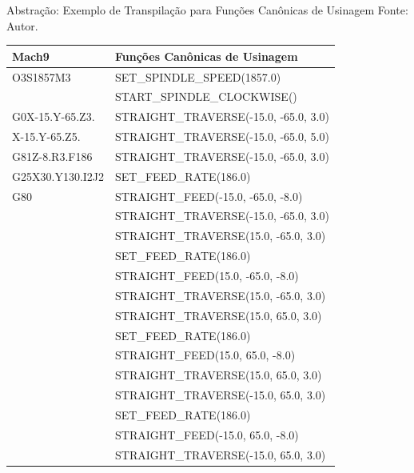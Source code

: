 \documentclass[aspectratio=169]{beamer}
\begin{document}
{\begin{frame}{Abstração: Exemplo de Transpilação para Funções Canônicas de Usinagem}
  \scriptsize{Fonte: Autor.}
  \begin{table}[H]
    \centering
    \begin{tabular}{ |l|l| } 
      \hline
      \tiny{\bfseries{Mach9}} & \tiny{\bfseries{Funções Canônicas de Usinagem}} \\
      \hline
      \tiny{O3S1857M3} & \tiny{SET\_SPINDLE\_SPEED(1857.0)} \\
      & \tiny{START\_SPINDLE\_CLOCKWISE()} \\
      \hline
      \tiny{G0X-15.Y-65.Z3.} & \tiny{STRAIGHT\_TRAVERSE(-15.0, -65.0, 3.0)} \\
      \hline
      \tiny{X-15.Y-65.Z5.} & \tiny{STRAIGHT\_TRAVERSE(-15.0, -65.0, 5.0)} \\
      \hline
      \tiny{G81Z-8.R3.F186} & \tiny{STRAIGHT\_TRAVERSE(-15.0, -65.0, 3.0)} \\
      \tiny{G25X30.Y130.I2J2} & \tiny{SET\_FEED\_RATE(186.0)} \\
      \tiny{G80} & \tiny{STRAIGHT\_FEED(-15.0, -65.0, -8.0)} \\
      & \tiny{STRAIGHT\_TRAVERSE(-15.0, -65.0, 3.0)} \\
      & \tiny{STRAIGHT\_TRAVERSE(15.0, -65.0, 3.0)} \\
      & \tiny{SET\_FEED\_RATE(186.0)} \\
      & \tiny{STRAIGHT\_FEED(15.0, -65.0, -8.0)} \\
      & \tiny{STRAIGHT\_TRAVERSE(15.0, -65.0, 3.0)} \\
      & \tiny{STRAIGHT\_TRAVERSE(15.0, 65.0, 3.0)} \\
      & \tiny{SET\_FEED\_RATE(186.0)} \\
      & \tiny{STRAIGHT\_FEED(15.0, 65.0, -8.0)} \\
      & \tiny{STRAIGHT\_TRAVERSE(15.0, 65.0, 3.0)} \\
      & \tiny{STRAIGHT\_TRAVERSE(-15.0, 65.0, 3.0)} \\
      & \tiny{SET\_FEED\_RATE(186.0)} \\
      & \tiny{STRAIGHT\_FEED(-15.0, 65.0, -8.0)} \\
      & \tiny{STRAIGHT\_TRAVERSE(-15.0, 65.0, 3.0)} \\
      \hline    
    \end{tabular}    
  \end{table}
\end{frame}


}
\end{document}

